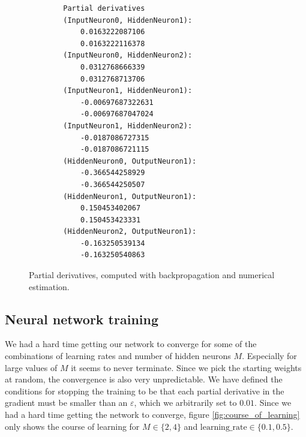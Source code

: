 \documentclass[a4paper]{article}
\begin{document}
\begin{figure}[H]
	\begin{lstlisting}
        Partial derivatives
        (InputNeuron0, HiddenNeuron1):
        	0.0163222087106
        	0.0163222116378
        (InputNeuron0, HiddenNeuron2):
        	0.0312768666339
        	0.0312768713706
        (InputNeuron1, HiddenNeuron1):
        	-0.00697687322631
        	-0.00697687047024
        (InputNeuron1, HiddenNeuron2):
        	-0.0187086727315
        	-0.0187086721115
        (HiddenNeuron0, OutputNeuron1):
        	-0.366544258929
        	-0.366544250507
        (HiddenNeuron1, OutputNeuron1):
        	0.150453402067
        	0.150453423331
        (HiddenNeuron2, OutputNeuron1):
        	-0.163250539134
        	-0.163250540863
        \end{lstlisting}
	\caption{Partial derivatives, computed with backpropagation and numerical estimation.}
	\label{fig:partial_derivatives}
\end{figure}

\subsection{Neural network training}
We had a hard time getting our network to converge for some of the combinations of learning rates and number of hidden neurons $M$. Especially for large values of $M$ it seems to never terminate. Since we pick the starting weights at random, the convergence is also very unpredictable. We have defined the conditions for stopping the training to be that each partial derivative in the gradient must be smaller than an $\varepsilon$, which we arbitrarily set to $0.01$. Since we had a hard time getting the network to converge, figure \ref{fig:course_of_learning} only shows the course of learning for $M \in \{ 2, 4 \}$ and $\text{learning\_rate} \in \{ 0.1, 0.5 \}$.
\end{document}
